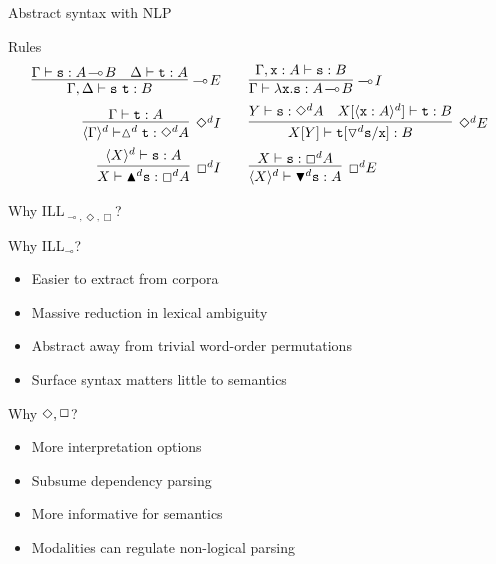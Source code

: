 \documentclass{beamer}
\newcommand{\term}[1]{\ensuremath{\mathtt{#1}}}
\newcommand{\li}{\!\multimap\!}
\begin{document}
\begin{frame}{Abstract syntax with NLP}
{	\begin{block}{Rules}
	\begin{align*}
		\infer[\li E]{\Gamma, \Delta \vdash \term{s\ t}: B}{\Gamma \vdash \term{s}: A \li B & \Delta \vdash \term{t}: A}
		&\qquad
		\infer[\li I]{\Gamma \vdash \term{\lambda x.s}: A \li B}{\Gamma, \term{x}: A \vdash \term{s}: B} \\
		\infer[\Diamond^d I]{\langle \Gamma \rangle^{d} \vdash \vartriangle^d \term{t}: \Diamond^d A}{\Gamma \vdash \term{t}: A}
		&\qquad
		\infer[\Diamond^d E]{X[Y] \vdash \term{t}[\triangledown^d \term{s}/\term{x}]: B}{
			Y \vdash \term{s}: \Diamond^d A
			&
			X[\langle \term{x}: A \rangle^d] \vdash \term{t}: B} \\
		\infer[\Box^d I]{X \vdash \blacktriangle^d \term{s}: \Box^d A}{\langle X \rangle^d \vdash \term{s}: A}
		&
		\qquad
		\infer[\Box^d E]{\langle X \rangle^d \vdash \blacktriangledown^d \term{s}: A}{X \vdash \term{s}: \Box^d A}
	\end{align*}
	\end{block}
}
\end{frame}

\begin{frame}{Why ILL$_{\li, \Diamond, \Box}$?}
\small
\begin{block}{Why ILL$_{\li}$?}
	\begin{itemize}
	\item Easier to extract from corpora
	\item Massive reduction in lexical ambiguity 
	\item Abstract away from trivial word-order permutations
	\item Surface syntax matters little to semantics
	\end{itemize}
\end{block}

\pause
\begin{block}{Why $\Diamond, \raisebox{1.5pt}{\ensuremath{\Box}}$?}
	\begin{itemize}
	\item More interpretation options
	\item Subsume dependency parsing
	\item More informative for semantics 
	\item Modalities can regulate non-logical parsing
	\end{itemize}
\end{block}

\end{frame}
\end{document}
